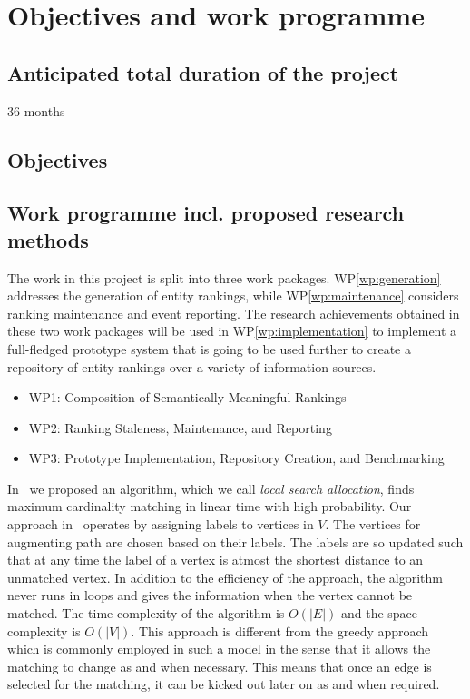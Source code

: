 \newpage

\section{Objectives and work programme}

	\subsection{Anticipated total duration of the project}
		36 months
\subsection{Objectives}


\subsection{Work programme incl. proposed research methods}

The work in this project is split into three work packages. WP\ref{wp:generation}   addresses the
generation of entity rankings, while WP\ref{wp:maintenance}  considers ranking maintenance and event reporting.
The research achievements obtained in these two work packages will be used in WP\ref{wp:implementation}  to implement a full-fledged
prototype system that is going to be used further to create a repository of entity rankings over a variety of information sources.

 
\begin{itemize}
\item WP1: Composition of Semantically Meaningful Rankings
\item WP2: Ranking Staleness, Maintenance, and Reporting
\item WP3: Prototype Implementation, Repository Creation, and Benchmarking 
\end{itemize}


\label{wp:generation}



\label{wp:maintenance}

In~\cite{ballsbins} we proposed an algorithm, which we call \emph{local search allocation}, finds maximum cardinality matching in linear time with high probability. Our approach in~\cite{ballsbins} operates by assigning labels to vertices in $V$. The vertices for augmenting path are chosen based on their labels. The labels are so updated such that at any time the label of a vertex is atmost the shortest distance to an unmatched vertex. In addition to the efficiency of the approach, the algorithm never runs in loops and gives the information when the vertex cannot be matched. The time complexity of the algorithm is $O(|E|)$ and the space complexity is $O(|V|)$. This approach is different from the greedy approach which is commonly employed in such a model in the sense that it allows the matching to change as and when necessary. This means that once an edge is selected for the matching, it can be kicked out later on as and when required.


